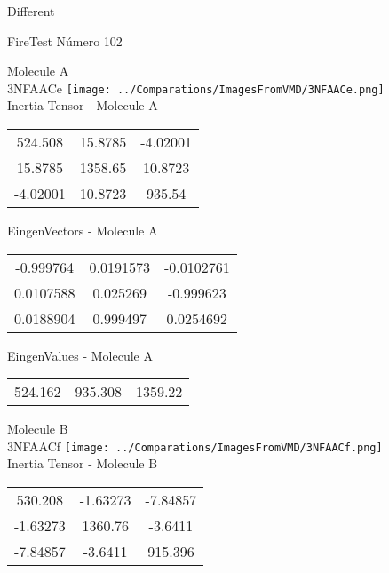 \begin{center}
\vtab
\vtab
\textcolor{NavyBlue}{\Large Different}
\end{center}

 \newpage

\vtab[-2cm]
\begin{center}
{\large FireTest \tab Número 102}
\end{center}
\begin{multicols}{2}
\begin{center}

Molecule A \\ 
3NFAACe
\texttt{[image: ../Comparations/ImagesFromVMD/3NFAACe.png]}
\\
Inertia Tensor - Molecule A \\
\vtab

\begin{tabular}{|c c c|}
524.508	 & 	15.8785	 & 	-4.02001	 \\
15.8785	 & 	1358.65	 & 	10.8723	 \\
-4.02001	 & 	10.8723	 & 	935.54
\end{tabular}

\vtab
 EingenVectors - Molecule A     \\
\vtab
\begin{tabular}{|c c c|}
-0.999764	 & 	0.0191573	 & 	-0.0102761	 \\
0.0107588	 & 	0.025269	 & 	-0.999623	 \\
0.0188904	 & 	0.999497	 & 	0.0254692
\end{tabular}

\vtab
 EingenValues - Molecule A     \\
\vtab
\begin{tabular}{|c c c|}
524.162	 & 	935.308	 & 	1359.22	 \\
\end{tabular}
\columnbreak

Molecule B \\ 
3NFAACf
\texttt{[image: ../Comparations/ImagesFromVMD/3NFAACf.png]}
\\
Inertia Tensor - Molecule B \\
\vtab

\begin{tabular}{|c c c|}
530.208	 & 	-1.63273	 & 	-7.84857	 \\
-1.63273	 & 	1360.76	 & 	-3.6411	 \\
-7.84857	 & 	-3.6411	 & 	915.396
\end{tabular}


\end{center}
\end{multicols}
